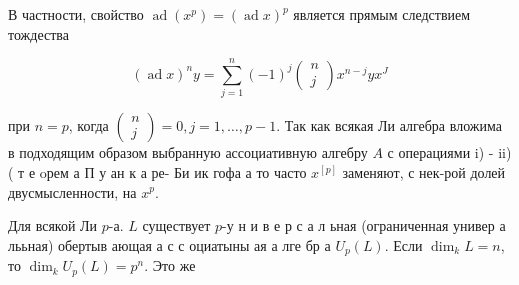 \documentclass[10pt]{article}
\begin{document}
В частности, свойство $\operatorname{ad}\left(x^{p}\right)=(\operatorname{ad} x)^{p}$ является прямым следствием тождества



\[

(\operatorname{ad} x)^{n} y=\sum_{j=1}^{n}(-1)^{j}\left(\begin{array}{c}

n \\

j

\end{array}\right) x^{n-j} y x^{J}

\]



при $n=p$, когда $\left(\begin{array}{l}n \\ j\end{array}\right)=0, j=1, \ldots, p-1$. Так как всякая Ли алгебра вложима в подходящим образом выбранную ассоциативную алгебру $A$ с операциями i) - ii) ( т е oрем а П у ан к а ре- Би ик гофа а то часто $x^{[p]}$ заменяют, с нек-рой долей двусмысленности, на $x^{p}$.



Для всякой Ли $p$-а. $L$ существует $p$-у н и в е р с а л ьная (ограниченная универ а лььная) обертыв ающая а с с оциатыны ая а лге бр а $U_{p}(L)$. Если $\operatorname{dim}_{k} L=n$, то $\operatorname{dim}_{k} U_{p}(L)=p^{n}$. Это же
\end{document}

